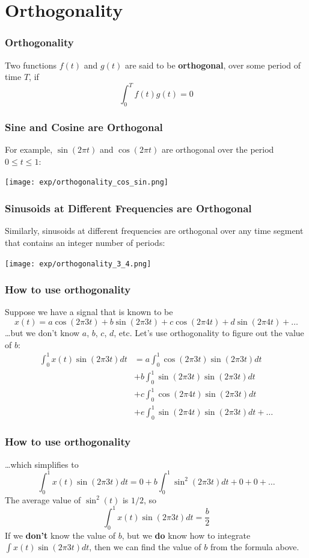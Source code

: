 \documentclass{beamer}
\begin{document}
\section[Orthogonality]{Orthogonality}
\setcounter{subsection}{1}

\begin{frame}
  \frametitle{Orthogonality}

  Two functions $f(t)$ and $g(t)$ are said to be {\bf orthogonal}, over
  some period of time $T$, if
  \[
  \int_0^T f(t)g(t) = 0
  \]
\end{frame}

\begin{frame}
  \frametitle{Sine and Cosine are Orthogonal}

  For example, $\sin(2\pi t)$ and $\cos(2\pi t)$ are orthogonal over
  the period $0\le t\le 1$:
  \centerline{\texttt{[image: exp/orthogonality\_cos\_sin.png]}}
\end{frame}

\begin{frame}
  \frametitle{Sinusoids at Different Frequencies are Orthogonal}

  Similarly, sinusoids at different frequencies are orthogonal over any time
  segment that contains an integer number of periods:
  \centerline{\texttt{[image: exp/orthogonality\_3\_4.png]}}
\end{frame}

\begin{frame}
  \frametitle{How to use orthogonality}

  Suppose we have a signal that is known to be
  \[
  x(t) = a\cos(2\pi 3t)+b\sin(2\pi 3t)+c\cos(2\pi 4 t)+d\sin(2\pi 4t)+\ldots
  \]
  \ldots but we don't know $a$, $b$, $c$, $d$, etc.  Let's use
  orthogonality to figure out the value of $b$:
  \begin{align*}
    \int_0^1 x(t)\sin(2\pi 3t)dt &= 
    a\int_0^1 \cos(2\pi 3t)\sin(2\pi 3t)dt \\
    &+ b\int_0^1\sin(2\pi 3t)\sin(2\pi 3t)dt\\
    &+ c\int_0^1\cos(2\pi  4t)\sin(2\pi 3t)dt\\
    &+e\int_0^1\sin(2\pi 4t)\sin(2\pi 3t)dt+\ldots
  \end{align*}
\end{frame}

\begin{frame}
  \frametitle{How to use orthogonality}

  \ldots which simplifies to
  \[
  \int_0^1 x(t)\sin(2\pi 3t)dt
  = 0 + b\int_0^1\sin^2(2\pi 3t)dt + 0 + 0 + \ldots
  \]
  The average value of $\sin^2(t)$ is $1/2$, so
  \[
  \int_0^1 x(t)\sin(2\pi 3t)dt = \frac{b}{2}
  \]
  If we {\bf don't} know the value of $b$,
  but we {\bf do} know how to integrate $\int x(t)\sin(2\pi 3t)dt$,
  then we can find the value of $b$ from the formula above.
\end{frame}
\end{document}
